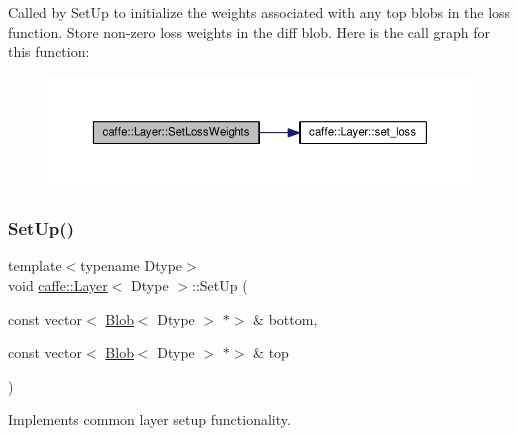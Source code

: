 Called by Set\+Up to initialize the weights associated with any top blobs in the loss function. Store non-\/zero loss weights in the diff blob. Here is the call graph for this function\+:
\nopagebreak
\begin{figure}[H]
\begin{center}
\leavevmode
\includegraphics[width=350pt]{classcaffe_1_1_layer_a04eb2a3d1d59c64cd64c233217d5d6fc_cgraph}
\end{center}
\end{figure}
\mbox{\label{classcaffe_1_1_layer_a18d6bfdb535ab8e96a971dec4ae39a84}} 
\subsubsection{\texorpdfstring{Set\+Up()}{SetUp()}\hspace{0.1cm}{\footnotesize\ttfamily [1/2]}}
{\footnotesize\ttfamily template$<$typename Dtype$>$ \\
void \mbox{\hyperlink{classcaffe_1_1_layer}{caffe\+::\+Layer}}$<$ Dtype $>$\+::Set\+Up (\begin{DoxyParamCaption}\item[{const vector$<$ \mbox{\hyperlink{classcaffe_1_1_blob}{Blob}}$<$ Dtype $>$ $\ast$$>$ \&}]{bottom,  }\item[{const vector$<$ \mbox{\hyperlink{classcaffe_1_1_blob}{Blob}}$<$ Dtype $>$ $\ast$$>$ \&}]{top }\end{DoxyParamCaption})\hspace{0.3cm}{\ttfamily [inline]}}



Implements common layer setup functionality. 



